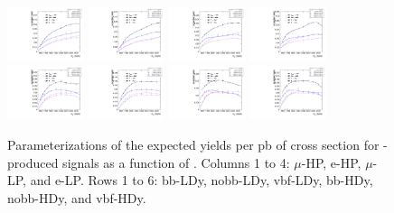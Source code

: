 \begin{figure}[htbp]
  \includegraphics[width=0.2\textwidth]{fig/2Dfit/paramSignalYield_VBFSig_mu_HP_nobb_HDy.pdf}
  \includegraphics[width=0.2\textwidth]{fig/2Dfit/paramSignalYield_VBFSig_e_HP_nobb_HDy.pdf}
  \includegraphics[width=0.2\textwidth]{fig/2Dfit/paramSignalYield_VBFSig_mu_LP_nobb_HDy.pdf}
  \includegraphics[width=0.2\textwidth]{fig/2Dfit/paramSignalYield_VBFSig_e_LP_nobb_HDy.pdf}\\
  \includegraphics[width=0.2\textwidth]{fig/2Dfit/paramSignalYield_VBFSig_mu_HP_vbf_HDy.pdf}
  \includegraphics[width=0.2\textwidth]{fig/2Dfit/paramSignalYield_VBFSig_e_HP_vbf_HDy.pdf}
  \includegraphics[width=0.2\textwidth]{fig/2Dfit/paramSignalYield_VBFSig_mu_LP_vbf_HDy.pdf}
  \includegraphics[width=0.2\textwidth]{fig/2Dfit/paramSignalYield_VBFSig_e_LP_vbf_HDy.pdf}\\
  \caption{
    Parameterizations of the expected yields per pb of cross section for \VBF-produced signals as a function of \MX.
    Columns 1 to 4: $\mu$-HP, e-HP, $\mu$-LP, and e-LP.
    Rows 1 to 6: bb-LDy, nobb-LDy, vbf-LDy, bb-HDy, nobb-HDy, and vbf-HDy.}
  \label{fig:YieldParam_VBF_Run2}
\end{figure}

